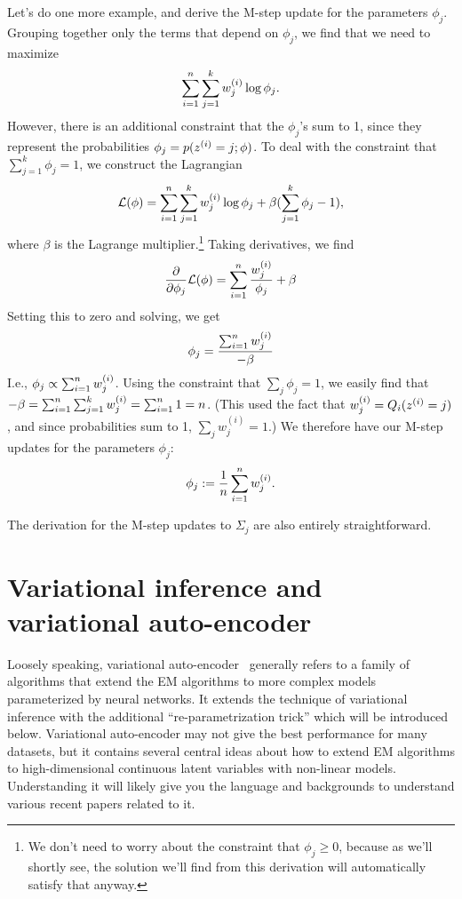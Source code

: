 \documentclass{article}
\begin{document}
Let's do one more example, and derive the M-step update
for the parameters $\phi_j$.  Grouping together only the terms that depend
on $\phi_j$, we find that we need to maximize
\[
\sum_{i=1}^{n} \sum_{j=1}^k w^{(i)}_j \log \phi_j.
\]
However, there is an additional constraint that the $\phi_j$'s sum to 1,
since they represent the probabilities $\phi_j = p({z^{(i)}}=j ;\phi)$.
To deal with the constraint that $\sum_{j=1}^k \phi_j =1$, we construct
the Lagrangian
\[
{\cal L}(\phi) = \sum_{i=1}^{n} \sum_{j=1}^k w^{(i)}_j \log \phi_j + \beta (\sum_{j=1}^k \phi_j -1),
\]
where $\beta$ is the Lagrange multiplier.\footnote{We don't need to worry about
the constraint that $\phi_j \geq 0$, because as we'll shortly see, the
solution we'll find from this derivation will automatically satisfy
that anyway.}
Taking derivatives, we find
\[
\frac{\partial}{\partial \phi_j} {\cal L}(\phi) = \sum_{i=1}^{n} \frac{w^{(i)}_j}{\phi_j} + \beta
\]
Setting this to zero and solving, we get
\[
\phi_j = \frac{\sum_{i=1}^{n} w_j^{(i)}}{-\beta}
\]
I.e., $\phi_j \propto \sum_{i=1}^{n} w_j^{(i)}$.  Using the constraint that
$\sum_j \phi_j = 1$, we easily find that
$-\beta = \sum_{i=1}^{n} \sum_{j=1}^k w_j^{(i)} = \sum_{i=1}^{n} 1 = {n}$.
(This used the fact that $w_j^{(i)} = Q_i({z^{(i)}}=j)$, and
since probabilities sum to 1, $\sum_j w_j^{(i)}=1$.) We therefore have
our M-step updates for the parameters $\phi_j$:
\[
\phi_j := \frac{1}{{n}} \sum_{i=1}^{n} w^{(i)}_j.
\]

The derivation for the M-step updates to $\Sigma_j$ are also entirely
straightforward.

\section{Variational inference and variational auto-encoder}

\newcommand{\cN}{\mathcal{N}}
Loosely speaking, variational auto-encoder~\cite{kingma2013auto} generally refers to a family of algorithms that extend the EM algorithms to more complex models parameterized by neural networks. It extends the technique of variational inference with the additional ``re-parametrization trick'' which will be introduced below. Variational auto-encoder may not give the best performance for many datasets, but it contains several central ideas about how to extend EM algorithms to high-dimensional continuous latent variables with non-linear models. Understanding it will likely give you the language and backgrounds to understand various recent papers related to it.  
\end{document}
